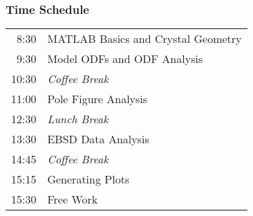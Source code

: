 \begin{frame}
\end{frame}


\begin{frame}
  \frametitle{Time Schedule}

 \renewcommand{\arraystretch}{1.25}
 \begin{center}
  \begin{tabular}{rl}
  \rowcolor{blue!10} 8:30  & MATLAB Basics and Crystal Geometry\\
	\rowcolor{blue!10} 9:30  & Model ODFs and ODF Analysis\\
  \hline \rowcolor{green!10} 10:30 & \textit{Coffee Break}\\\hline

  \rowcolor{blue!10}   11:00 & Pole Figure Analysis\\
  \hline  \rowcolor{green!10} 12:30 &\textit{Lunch Break}\\\hline

   \rowcolor{blue!10} 13:30 & EBSD Data Analysis\\
   \hline \rowcolor{green!10} 14:45 & \textit{Coffee Break}\\\hline

   \rowcolor{blue!10}  15:15 & Generating Plots \\
  \rowcolor{blue!10} 15:30 & Free Work
  \end{tabular}
  \end{center}

\end{frame}

